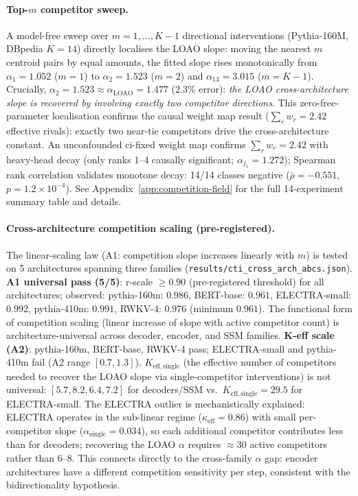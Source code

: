 \documentclass{article}
\begin{document}
\paragraph{Top-$m$ competitor sweep.}
A model-free sweep over $m=1,\ldots,K\!-\!1$ directional interventions (Pythia-160M, DBpedia $K=14$) directly localises the LOAO slope: moving the nearest $m$ centroid pairs by equal amounts, the fitted slope rises monotonically from $\alpha_1=1.052$ ($m=1$) to $\alpha_2=1.523$ ($m=2$) and $\alpha_{13}=3.015$ ($m=K\!-\!1$).
Crucially, $\alpha_2=1.523\approx\alpha_\mathrm{LOAO}=1.477$ (2.3\% error): \emph{the LOAO cross-architecture slope is recovered by involving exactly two competitor directions}.
This zero-free-parameter localisation confirms the causal weight map result ($\sum_r w_r=2.42$ effective rivals): exactly two near-tie competitors drive the cross-architecture constant.
An unconfounded ci-fixed weight map confirms $\sum_r w_r=2.42$ with heavy-head decay (only
ranks 1--4 causally significant; $\alpha_{j_1}=1.272$); Spearman rank correlation validates
monotone decay: 14/14 classes negative ($\bar\rho=-0.551$, $p=1.2\times10^{-4}$).
See Appendix~\ref{app:competition-field} for the full 14-experiment summary table and details.

\paragraph{Cross-architecture competition scaling (pre-registered).}
The linear-scaling law (A1: competition slope increases linearly with $m$) is tested on 5 architectures spanning three families (\texttt{results/cti\_cross\_arch\_abcs.json}).
\textbf{A1 universal pass (5/5)}: r-scale $\geq 0.90$ (pre-registered threshold) for all architectures; observed: pythia-160m: $0.986$, BERT-base: $0.961$, ELECTRA-small: $0.992$, pythia-410m: $0.991$, RWKV-4: $0.976$ (minimum $0.961$).
The functional form of competition scaling (linear increase of slope with active competitor count) is architecture-universal across decoder, encoder, and SSM families.
\textbf{K-eff scale (A2)}: pythia-160m, BERT-base, RWKV-4 pass; ELECTRA-small and pythia-410m fail (A2 range $[0.7,1.3]$).
$K_\mathrm{eff,single}$ (the effective number of competitors needed to recover the LOAO slope via single-competitor interventions) is not universal: $[5.7, 8.2, 6.4, 7.2]$ for decoders/SSM vs.\ $K_\mathrm{eff,single}=29.5$ for ELECTRA-small.
The ELECTRA outlier is mechanistically explained: ELECTRA operates in the sub-linear regime ($\kappa_{\mathrm{eff}}=0.86$) with small per-competitor slope ($\alpha_\mathrm{single}=0.034$), so each additional competitor contributes less than for decoders; recovering the LOAO $\alpha$ requires $\approx30$ active competitors rather than 6--8.
This connects directly to the cross-family $\alpha$ gap: encoder architectures have a different competition sensitivity per step, consistent with the bidirectionality hypothesis.
\end{document}
